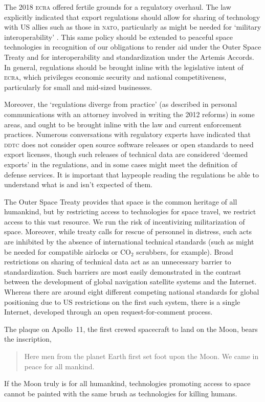 \documentclass[12pt]{olfmemo}
\begin{document}
The 2018 \textsc{ecra} offered fertile grounds for a regulatory overhaul. The law explicitly indicated that export regulations should allow for sharing of technology with US allies such as those in \textsc{nato}, particularly as might be needed for `military interoperability' \citep{ECRA2018}. This same policy should be extended to peaceful space technologies in recognition of our obligations to render aid under the Outer Space Treaty and for interoperability and standardization under the Artemis Accords. In general, regulations should be brought inline with the legislative intent of \textsc{ecra}, which privileges economic security and national competitiveness, particularly for small and mid-sized businesses.

Moreover, the `regulations diverge from practice' (as described in personal communications with an attorney involved in writing the 2012 reforms) in some areas, and ought to be brought inline with the law and current enforcement practices. Numerous conversations with regulatory experts have indicated that \textsc{ddtc} does not consider open source software releases or open standards to need export licenses, though such releases of technical data are considered `deemed exports' in the regulations, and in some cases might meet the definition of defense services. It is important that laypeople reading the regulations be able to understand what is and isn't expected of them.

The Outer Space Treaty provides that space is the common heritage of all humankind, but by restricting access to technologies for space travel, we restrict access to this vast resource. We run the risk of incentivizing militarization of space. Moreover, while treaty calls for rescue of personnel in distress, such acts are inhibited by the absence of international technical standards (such as might be needed for compatible airlocks or $\textrm{CO}_2$ scrubbers, for example). Broad restrictions on sharing of technical data act as an unnecessary barrier to standardization. Such barriers are most easily demonstrated in the contrast between the development of global navigation satellite systems and the Internet. Whereas there are around eight different competing national standards for global positioning due to US restrictions on the first such system, there is a single Internet, developed through an open request-for-comment process.

The plaque on Apollo~11, the first crewed spacecraft to land on the Moon, bears the inscription,
\begin{quote}Here men from the planet Earth first set foot upon the Moon. We came in peace for all mankind.\end{quote} If the Moon truly is for all humankind, technologies promoting access to space cannot be painted with the same brush as technologies for killing humans.
\end{document}
